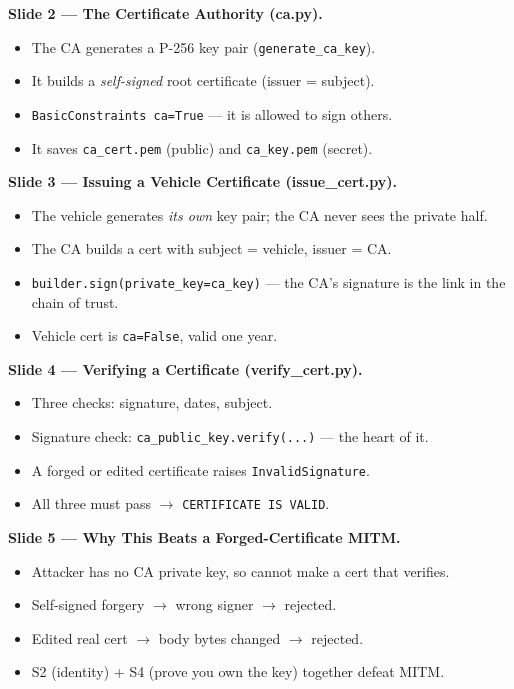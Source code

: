 \documentclass[11pt,a4paper]{report}
\begin{document}
\textbf{Slide 2 --- The Certificate Authority (ca.py).}
\begin{itemize}
  \item The CA generates a P-256 key pair (\texttt{generate\_ca\_key}).
  \item It builds a \emph{self-signed} root certificate (issuer = subject).
  \item \texttt{BasicConstraints ca=True} --- it is allowed to sign others.
  \item It saves \texttt{ca\_cert.pem} (public) and \texttt{ca\_key.pem} (secret).
\end{itemize}

\textbf{Slide 3 --- Issuing a Vehicle Certificate (issue\_cert.py).}
\begin{itemize}
  \item The vehicle generates \emph{its own} key pair; the CA never sees the
        private half.
  \item The CA builds a cert with subject = vehicle, issuer = CA.
  \item \texttt{builder.sign(private\_key=ca\_key)} --- the CA's signature is the
        link in the chain of trust.
  \item Vehicle cert is \texttt{ca=False}, valid one year.
\end{itemize}

\textbf{Slide 4 --- Verifying a Certificate (verify\_cert.py).}
\begin{itemize}
  \item Three checks: signature, dates, subject.
  \item Signature check: \texttt{ca\_public\_key.verify(...)} --- the heart of it.
  \item A forged or edited certificate raises \texttt{InvalidSignature}.
  \item All three must pass $\to$ \texttt{CERTIFICATE IS VALID}.
\end{itemize}

\textbf{Slide 5 --- Why This Beats a Forged-Certificate MITM.}
\begin{itemize}
  \item Attacker has no CA private key, so cannot make a cert that verifies.
  \item Self-signed forgery $\to$ wrong signer $\to$ rejected.
  \item Edited real cert $\to$ body bytes changed $\to$ rejected.
  \item S2 (identity) + S4 (prove you own the key) together defeat MITM.
\end{itemize}
\end{document}
